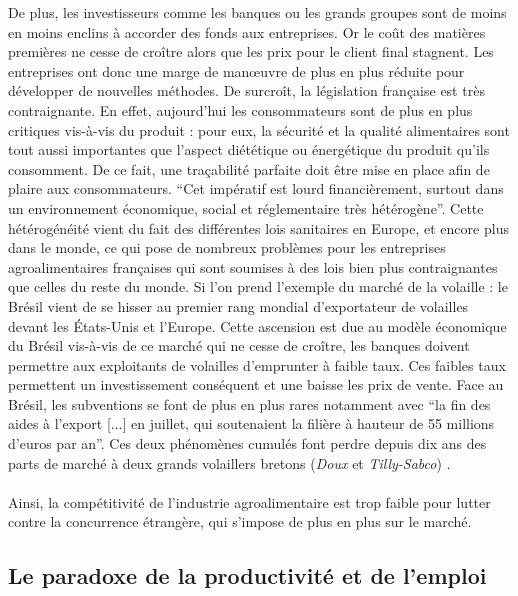 \documentclass[a4paper,12pt]{report}
\begin{document}
			De plus, les investisseurs comme les banques ou les grands groupes sont de moins en moins enclins à accorder des fonds aux entreprises. Or le coût des matières premières ne cesse de croître alors que les prix pour le client final stagnent. Les entreprises ont donc une marge de manœuvre de plus en plus réduite pour développer de nouvelles méthodes. De surcroît, la législation française est très contraignante. En effet, aujourd’hui les consommateurs sont de plus en plus critiques vis-à-vis du produit : pour eux, la sécurité et la qualité alimentaires sont tout aussi importantes que l’aspect diététique ou énergétique du produit qu’ils consomment. De ce fait, une traçabilité parfaite doit être mise en place afin de plaire aux consommateurs. “Cet impératif est lourd financièrement, surtout dans un environnement économique, social et réglementaire très hétérogène”\cite{SecteurAAFrancaisEnjeuxXXISiecle}. Cette hétérogénéité vient du fait des différentes lois sanitaires en Europe, et encore plus dans le monde, ce qui pose de nombreux problèmes pour les entreprises agroalimentaires françaises qui sont soumises à des lois bien plus contraignantes que celles du reste du monde. Si l’on prend l’exemple du marché de la volaille : le Brésil vient de se hisser au premier rang mondial d’exportateur de volailles devant les États-Unis et l’Europe. Cette ascension est due au modèle économique du Brésil vis-à-vis de ce marché qui ne cesse de croître, les banques doivent permettre aux exploitants de volailles d'emprunter à faible taux. Ces faibles taux permettent un investissement conséquent et une baisse les prix de vente. Face au Brésil, les subventions se font de plus en plus rares notamment avec “la fin des aides à l'export [...] en juillet, qui soutenaient la filière à hauteur de 55 millions d'euros par an”.\cite{PouletBresilienMoinsCherBreton} Ces deux phénomènes cumulés font perdre depuis dix ans des parts de marché à deux grands volaillers bretons (\textit{Doux} et \textit{Tilly-Sabco}) .
			
		\paragraph{}Ainsi, la compétitivité de l'industrie agroalimentaire est trop faible pour lutter contre la concurrence étrangère, qui s'impose de plus en plus sur le marché.
			

		\subsection{Le paradoxe de la productivité et de l'emploi}
\end{document}
